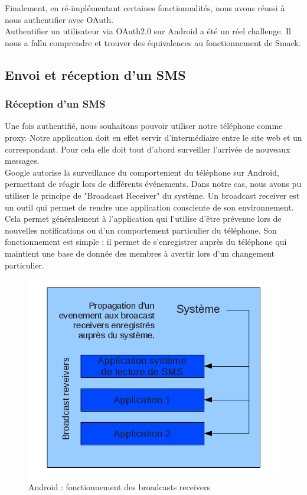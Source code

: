 Finalement, en ré-implémentant certaines fonctionnalités, nous avons réussi à nous authentifier avec OAuth.
\\


Authentifier un utilisateur via OAuth2.0 sur Android a été un réel challenge. Il nous a fallu comprendre 
et trouver des équivalences au fonctionnement de Smack.



\subsection{Envoi et réception d'un SMS}

\subsubsection{Réception d'un SMS}

Une fois authentifié, nous souhaitons pouvoir utiliser notre téléphone comme proxy. Notre application
doit en effet servir d'intermédiaire entre le site web et un correspondant. Pour cela elle doit tout
d'abord surveiller l'arrivée de nouveaux messages. 
\\


Google autorise la surveillance du comportement du téléphone sur Android, permettant de réagir lors de différents événements.
Dans notre cas, nous avons pu utiliser le principe de "Broadcast Receiver" du système. 
Un broadcast receiver est un outil qui permet de rendre une application consciente de son environnement.
Cela permet généralement à l'application qui l'utilise d'être prévenue lors de nouvelles notifications ou 
d'un comportement particulier du téléphone.
Son fonctionnement est simple : il permet de s'enregistrer auprès du téléphone qui maintient une base de donnée des membres à avertir lors d'un changement particulier.

\begin{figure}[!h]
  \center
  \includegraphics[width=12cm]{img/broadcast-receivers.png}
  \caption{Android : fonctionnement des broadcasts receivers}
  \label{broadcast-receivers}
\end{figure}

